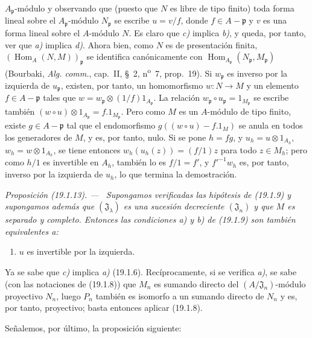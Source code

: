 \documentclass[10pt,oneside]{book}
\makeatletter
\newcommand{\setmanualcurrentlabel}[1]{\def\@currentlabel{#1}}
\newenvironment{proposition}[1][]{%
  \setmanualcurrentlabel{#1}\par\medskip\noindent\itshape Proposición (#1). ---\ }{\par}
\providecommand{\setmin}{-}%
\makeatother
\begin{document}
$A_{\mathfrak p}$-módulo y observando que (puesto que $N$ es libre de tipo
finito) toda forma lineal sobre el $A_{\mathfrak p}$-módulo
$N_{\mathfrak p}$ se escribe $u=v/f$, donde $f\in A\setmin\mathfrak p$ y $v$ es una
forma lineal sobre el $A$-módulo $N$. Es claro que \emph{c)} implica \emph{b)}, y queda, por
tanto, ver que \emph{a)} implica \emph{d)}. Ahora bien, como $N$ es de presentación finita,
$(\operatorname{Hom}_A(N,M))_{\mathfrak p}$ se identifica canónicamente con
$\operatorname{Hom}_{A_{\mathfrak p}}(N_{\mathfrak p},M_{\mathfrak p})$
(Bourbaki, \emph{Alg. comm.}, cap.~II, §~2, n\textsuperscript{o}~7,
prop.~19). Si $w_{\mathfrak p}$ es inverso por la izquierda de $u_{\mathfrak p}$,
existen, por tanto, un homomorfismo $w:N\to M$ y un elemento $f\in A\setmin\mathfrak p$ tales que
$w=w_{\mathfrak p}\otimes(1/f)1_{A_{\mathfrak p}}$. La relación
$w_{\mathfrak p}\circ u_{\mathfrak p}=1_{M_{\mathfrak p}}$ se escribe también
$(w\circ u)\otimes1_{A_{\mathfrak p}}=f.1_{M_{\mathfrak p}}$. Pero como $M$
es un $A$-módulo de tipo finito, existe $g\in A\setmin\mathfrak p$ tal que el
endomorfismo $g((w\circ u)\setmin f.1_M)$ se anula en todos los generadores de $M$, y
es, por tanto, nulo. Si se pone $h=fg$, y
$u_h=u\otimes1_{A_h}$, $w_h=w\otimes1_{A_h}$, se tiene entonces
$w_h(u_h(z))=(f/1)z$ para todo $z\in M_h$; pero como $h/1$ es invertible en
$A_h$, también lo es $f/1=f'$, y $f'^{-1}w_h$ es, por tanto, inverso por la
izquierda de $u_h$, lo que termina la demostración.

\begin{proposition}[19.1.13]
\label{0.19.1.13-es}
Supongamos verificadas las hipótesis de \textup{(19.1.9)} y supongamos además que
$(\mathfrak J_\lambda)$ es una sucesión decreciente $(\mathfrak J_n)$ y que $M$
es separado y completo. Entonces las condiciones \textup{a)} y \textup{b)} de \textup{(19.1.9)} son
también equivalentes a:
\begin{enumerate}
  \item[\textup{c)}] $u$ es invertible por la izquierda.
\end{enumerate}
\end{proposition}

Ya se sabe que \emph{c)} implica \emph{a)} (19.1.6). Recíprocamente, si se verifica \emph{a)}, se
sabe (con las notaciones de (19.1.8)) que $M_n$ es sumando directo del
$(A/\mathfrak J_n)$-módulo proyectivo $N_n$, luego $P_n$ también es isomorfo a
un sumando directo de $N_n$ y es, por tanto, proyectivo; basta entonces aplicar
(19.1.8).

Señalemos, por último, la proposición siguiente:
\end{document}
